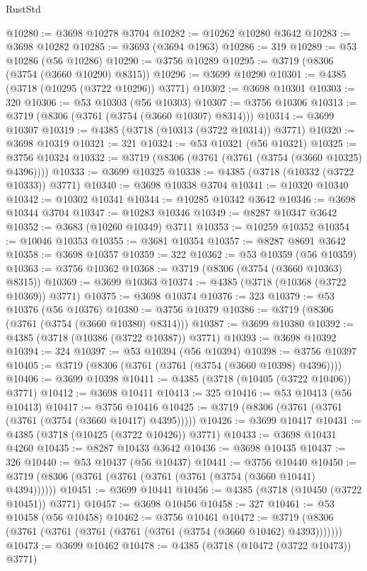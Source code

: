 \begin{lexlean}{RustStd}
\begin{coremodule}
{\begin{coremodule}
{{{{{{{{{{{{{{{{{{{{{{{{{{{{{{{{{{{{{{{{{{{{{{{@10280 := @3698 @10278 @3704
@10282 := @10262 @10280 @3642
@10283 := @3698 @10282
@10285 := @3693 (@3694 @1963)
@10286 := 319
@10289 := @53 @10286 (@56 @10286)
@10290 := @3756 @10289
@10295 := @3719 (@8306 (@3754 (@3660 @10290) @8315))
@10296 := @3699 @10290
@10301 := @4385 (@3718 (@10295 (@3722 @10296)) @3771)
@10302 := @3698 @10301
@10303 := 320
@10306 := @53 @10303 (@56 @10303)
@10307 := @3756 @10306
@10313 := @3719 (@8306 (@3761 (@3754 (@3660 @10307) @8314)))
@10314 := @3699 @10307
@10319 := @4385 (@3718 (@10313 (@3722 @10314)) @3771)
@10320 := @3698 @10319
@10321 := 321
@10324 := @53 @10321 (@56 @10321)
@10325 := @3756 @10324
@10332 := @3719 (@8306 (@3761 (@3761 (@3754 (@3660 @10325) @4396))))
@10333 := @3699 @10325
@10338 := @4385 (@3718 (@10332 (@3722 @10333)) @3771)
@10340 := @3698 @10338 @3704
@10341 := @10320 @10340
@10342 := @10302 @10341
@10344 := @10285 @10342 @3642
@10346 := @3698 @10344 @3704
@10347 := @10283 @10346
@10349 := @8287 @10347 @3642
@10352 := @3683 (@10260 @10349) @3711
@10353 := @10259 @10352
@10354 := @10046 @10353
@10355 := @3681 @10354
@10357 := @8287 @8691 @3642
@10358 := @3698 @10357
@10359 := 322
@10362 := @53 @10359 (@56 @10359)
@10363 := @3756 @10362
@10368 := @3719 (@8306 (@3754 (@3660 @10363) @8315))
@10369 := @3699 @10363
@10374 := @4385 (@3718 (@10368 (@3722 @10369)) @3771)
@10375 := @3698 @10374
@10376 := 323
@10379 := @53 @10376 (@56 @10376)
@10380 := @3756 @10379
@10386 := @3719 (@8306 (@3761 (@3754 (@3660 @10380) @8314)))
@10387 := @3699 @10380
@10392 := @4385 (@3718 (@10386 (@3722 @10387)) @3771)
@10393 := @3698 @10392
@10394 := 324
@10397 := @53 @10394 (@56 @10394)
@10398 := @3756 @10397
@10405 := @3719 (@8306 (@3761 (@3761 (@3754 (@3660 @10398) @4396))))
@10406 := @3699 @10398
@10411 := @4385 (@3718 (@10405 (@3722 @10406)) @3771)
@10412 := @3698 @10411
@10413 := 325
@10416 := @53 @10413 (@56 @10413)
@10417 := @3756 @10416
@10425 := @3719 (@8306 (@3761 (@3761 (@3761 (@3754 (@3660 @10417) @4395)))))
@10426 := @3699 @10417
@10431 := @4385 (@3718 (@10425 (@3722 @10426)) @3771)
@10433 := @3698 @10431 @4260
@10435 := @8287 @10433 @3642
@10436 := @3698 @10435
@10437 := 326
@10440 := @53 @10437 (@56 @10437)
@10441 := @3756 @10440
@10450 := @3719 (@8306 (@3761 (@3761 (@3761 (@3761 (@3754 (@3660 @10441) @4394))))))
@10451 := @3699 @10441
@10456 := @4385 (@3718 (@10450 (@3722 @10451)) @3771)
@10457 := @3698 @10456
@10458 := 327
@10461 := @53 @10458 (@56 @10458)
@10462 := @3756 @10461
@10472 := @3719 (@8306 (@3761 (@3761 (@3761 (@3761 (@3761 (@3754 (@3660 @10462) @4393)))))))
@10473 := @3699 @10462
@10478 := @4385 (@3718 (@10472 (@3722 @10473)) @3771)
}}}}}}}}}}}}}}}}}}}}}}}}}}}}}}}}}}}}}}}}}}}}}}}
\end{coremodule}}
\end{coremodule}
\end{lexlean}
